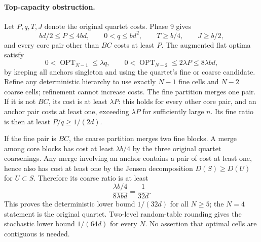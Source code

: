 \paragraph{Top-capacity obstruction.}
Let $P,q,T,J$ denote the original quartet costs. Phase 9 gives
\[
 bd/2\le P\le4bd,\qquad0<q\le bd^2,
 \qquad T\ge b/4,\qquad J\ge b/2,
\]
and every core pair other than $BC$ costs at least $P$.
The augmented flat optima satisfy
\[
 0<\operatorname{OPT}_{N-1}\le\lambda q,
 \qquad0<\operatorname{OPT}_{N-2}\le2\lambda P\le8\lambda bd,
\]
by keeping all anchors singleton and using the quartet's fine or coarse
candidate. Refine any deterministic hierarchy to use exactly $N-1$
fine cells and $N-2$ coarse cells; refinement cannot increase costs.
The fine partition merges one pair. If it is not $BC$, its cost is at
least $\lambda P$: this holds for every other core pair, and an
anchor pair costs at least one, exceeding $\lambda P$ for sufficiently
large $n$. Its fine ratio is then at least $P/q\ge1/(2d)$.

If the fine pair is $BC$, the coarse partition merges two fine blocks.
A merge among core blocks has cost at least $\lambda b/4$ by the
three original quartet coarsenings. Any merge involving an anchor
contains a pair of cost at least one, hence also has cost at least one
by the Jensen decomposition $D(S)\ge D(U)$ for $U\subset S$.
Therefore its coarse ratio is at least
\[
 \frac{\lambda b/4}{8\lambda bd}=\frac1{32d}.
\]
This proves the deterministic lower bound $1/(32d)$ for all $N\ge5$;
the $N=4$ statement is the original quartet. Two-level random-table
rounding gives the stochastic lower bound $1/(64d)$ for every $N$.
No assertion that optimal cells are contiguous is needed.

